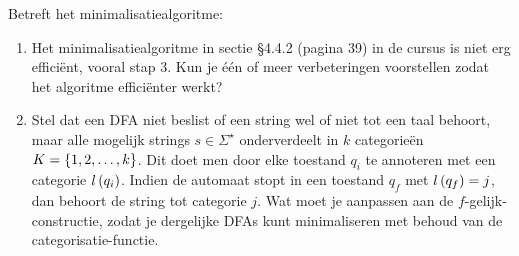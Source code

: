 \documentclass{article}
\begin{document}
\begin{question}
Betreft het minimalisatiealgoritme:
\begin{enumerate}
 \item Het minimalisatiealgoritme in sectie \S4.4.2 (pagina 39) in de cursus is niet erg effici\"ent, vooral stap 3. Kun je \'e\'en of meer verbeteringen voorstellen zodat het algoritme effici\"enter werkt?
 \item Stel dat een DFA niet beslist of een string wel of niet tot een taal behoort, maar alle mogelijk strings $s\in\Sigma^{\star}$ onderverdeelt in $k$ categorie\"en $K=\left\{ 1,2,\ldots,k \right\}$. Dit doet men door elke toestand $q_i$ te annoteren met een categorie $l\left( q_i \right)$. Indien de automaat stopt in een toestand $q_f$ met $l\left( q_f \right)=j$, dan behoort de string tot categorie $j$. Wat moet je aanpassen aan de $f$-gelijk-constructie, zodat je dergelijke DFAs kunt minimaliseren met behoud van de categorisatie-functie.
\end{enumerate}
\end{question}
\end{document}

